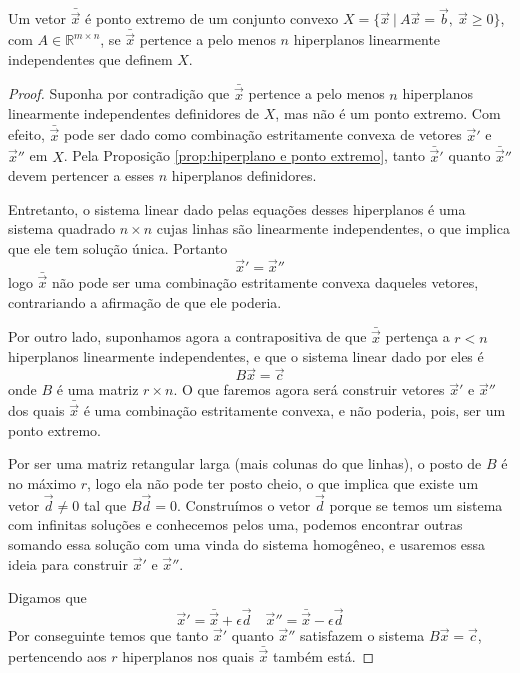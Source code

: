 \begin{thm:ponto extremo}
	\label{thm:ponto extremo}
	Um vetor $\bar{\vec{x}}$ é ponto extremo de um conjunto convexo $X = \{\vec{x}\ |\ A\vec{x} = \vec{b},\ \vec{x} \geq 0\}$, com $A \in \mathbb{R}^{m \times n}$, se $\bar{\vec{x}}$ pertence a pelo menos $n$ hiperplanos linearmente independentes que definem $X$.
	
	\begin{proof}
		Suponha por contradição que $\bar{\vec{x}}$ pertence a pelo menos $n$ hiperplanos linearmente independentes definidores de $X$, mas não é um ponto extremo. Com efeito, $\bar{\vec{x}}$ pode ser dado como combinação estritamente convexa de vetores $\vec{x}'$ e $\vec{x}''$ em $X$. Pela Proposição \ref{prop:hiperplano e ponto extremo}, tanto $\bar{\vec{x}}'$ quanto $\bar{\vec{x}}''$ devem pertencer a esses $n$ hiperplanos definidores.
		
		Entretanto, o sistema linear dado pelas equações desses hiperplanos é uma sistema quadrado $n \times n$ cujas linhas são linearmente independentes, o que implica que ele tem solução única. Portanto \[\vec{x}' = \vec{x}''\]logo $\bar{\vec{x}}$ não pode ser uma combinação estritamente convexa daqueles vetores, contrariando a afirmação de que ele poderia.
		
		Por outro lado, suponhamos agora a contrapositiva de que $\bar{\vec{x}}$ pertença a $r < n$ hiperplanos linearmente independentes, e que o sistema linear dado por eles é \[B\vec{x} = \vec{c}\]onde $B$ é uma matriz $r \times n$. O que faremos agora será construir vetores $\vec{x}'$ e $\vec{x}''$ dos quais $\bar{\vec{x}}$ é uma combinação estritamente convexa, e não poderia, pois, ser um ponto extremo.  
		
		Por ser uma matriz retangular larga (mais colunas do que linhas), o posto de $B$ é no máximo $r$, logo ela não pode ter posto cheio, o que implica que existe um vetor $\vec{d} \neq 0$ tal que $B \vec{d} = 0$. Construímos o vetor $\vec{d}$ porque se temos um sistema com infinitas soluções e conhecemos pelos uma, podemos encontrar outras somando essa solução com uma vinda do sistema homogêneo, e usaremos essa ideia para construir $\vec{x}'$ e $\vec{x}''$.
		
		Digamos que
		\begin{equation*}
			\vec{x}' = \bar{\vec{x}} + \epsilon \vec{d}
			\quad
			\vec{x}'' = \bar{\vec{x}} - \epsilon \vec{d}
		\end{equation*}
		Por conseguinte temos que tanto $\vec{x}'$ quanto $\vec{x}''$ satisfazem o sistema $B\vec{x} = \vec{c}$, pertencendo aos $r$ hiperplanos nos quais $\bar{\vec{x}}$ também está. 
		

\end{proof}
\end{thm:ponto extremo}
